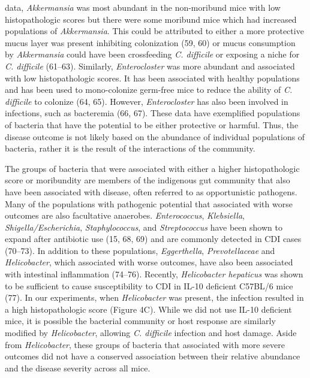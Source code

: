 \documentclass[
  12pt,
]{article}
\begin{document}
data, \emph{Akkermansia} was most abundant in the non-moribund mice with
low histopathologic scores but there were some moribund mice which had
increased populations of \emph{Akkermansia}. This could be attributed to
either a more protective mucus layer was present inhibiting colonization
(59, 60) or mucus consumption by \emph{Akkermansia} could have been
crossfeeding \emph{C. difficile} or exposing a niche for \emph{C.
difficile} (61--63). Similarly, \emph{Enterocloster} was more abundant
and associated with low histopathologic scores. It has been associated
with healthy populations and has been used to mono-colonize germ-free
mice to reduce the ability of \emph{C. difficile} to colonize (64, 65).
However, \emph{Enterocloster} has also been involved in infections, such
as bacteremia (66, 67). These data have exemplified populations of
bacteria that have the potential to be either protective or harmful.
Thus, the disease outcome is not likely based on the abundance of
individual populations of bacteria, rather it is the result of the
interactions of the community.

The groups of bacteria that were associated with either a higher
histopathologic score or moribundity are members of the indigenous gut
community that also have been associated with disease, often referred to
as opportunistic pathogens. Many of the populations with pathogenic
potential that associated with worse outcomes are also facultative
anaerobes. \emph{Enterococcus}, \emph{Klebsiella},
\emph{Shigella/Escherichia}, \emph{Staphylococcus}, and
\emph{Streptococcus} have been shown to expand after antibiotic use (15,
68, 69) and are commonly detected in CDI cases (70--73). In addition to
these populations, \emph{Eggerthella}, \emph{Prevotellaceae} and
\emph{Helicobacter}, which associated with worse outcomes, have also
been associated with intestinal inflammation (74--76). Recently,
\emph{Helicobacter hepaticus} was shown to be sufficient to cause
susceptibility to CDI in IL-10 deficient C57BL/6 mice (77). In our
experiments, when \emph{Helicobacter} was present, the infection
resulted in a high histopathologic score (Figure 4C). While we did not
use IL-10 deficient mice, it is possible the bacterial community or host
response are similarly modified by \emph{Helicobacter}, allowing
\emph{C. difficile} infection and host damage. Aside from
\emph{Helicobacter}, these groups of bacteria that associated with more
severe outcomes did not have a conserved association between their
relative abundance and the disease severity across all mice.
\end{document}
